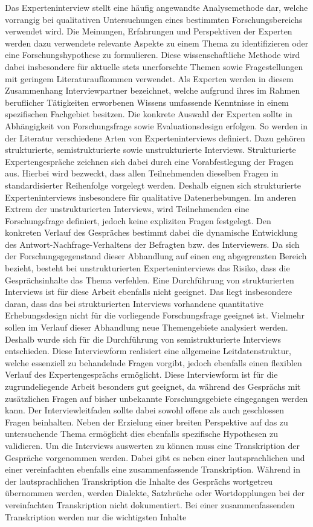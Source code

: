 Das Experteninterview stellt eine häufig angewandte Analysemethode dar, welche vorrangig bei qualitativen Untersuchungen eines bestimmten Forschungsbereichs verwendet wird. Die Meinungen, Erfahrungen und Perspektiven der Experten werden dazu verwendete relevante Aspekte zu einem Thema zu identifizieren oder eine Forschungshypothese zu formulieren. Diese wissenschaftliche Methode wird dabei insbesondere für aktuelle stets unerforschte Themen sowie Fragestellungen mit geringem Literaturaufkommen verwendet. Als Experten werden in diesem Zusammenhang Interviewpartner bezeichnet, welche aufgrund ihres im Rahmen beruflicher Tätigkeiten erworbenen Wissens umfassende Kenntnisse in einem spezifischen Fachgebiet besitzen. Die konkrete Auswahl der Experten sollte in Abhängigkeit von Forschungsfrage sowie Evaluationsdesign erfolgen. So werden in der Literatur verschiedene Arten von Experteninterviews definiert. Dazu gehören strukturierte, semistrukturierte sowie unstrukturierte Interviews. Strukturierte Expertengespräche zeichnen sich dabei durch eine Vorabfestlegung der Fragen aus. Hierbei wird bezweckt, dass allen Teilnehmenden dieselben Fragen in standardisierter Reihenfolge vorgelegt werden. Deshalb eignen sich strukturierte Experteninterviews insbesondere für qualitative Datenerhebungen. Im anderen Extrem der unstrukturierten Interviews, wird Teilnehmenden eine Forschungsfrage definiert, jedoch keine expliziten Fragen festgelegt. Den konkreten Verlauf des Gespräches bestimmt dabei die dynamische Entwicklung des Antwort-Nachfrage-Verhaltens der Befragten bzw. des Interviewers. Da sich der Forschungsgegenstand dieser Abhandlung auf einen eng abgegrenzten Bereich bezieht, besteht bei unstrukturierten Experteninterviews das Risiko, dass die Gesprächsinhalte das Thema verfehlen. Eine Durchführung von strukturierten Interviews ist für diese Arbeit ebenfalls nicht geeignet. Das liegt insbesondere daran, dass das bei strukturierten Interviews vorhandene quantitative Erhebungsdesign nicht für die vorliegende Forschungsfrage geeignet ist. Vielmehr sollen im Verlauf dieser Abhandlung neue Themengebiete analysiert werden. Deshalb wurde sich für die Durchführung von semistrukturierte Interviews entschieden. Diese Interviewform realisiert eine allgemeine Leitdatenstruktur, welche essenziell zu behandelnde Fragen vorgibt, jedoch ebenfalls einen flexiblen Verlauf des Expertengesprächs ermöglicht. Diese Interviewform ist für die zugrundeliegende Arbeit besonders gut geeignet, da während des Gesprächs mit zusätzlichen Fragen auf bisher unbekannte Forschungsgebiete eingegangen werden kann. Der Interviewleitfaden sollte dabei sowohl offene als auch geschlossen Fragen beinhalten. Neben der Erzielung einer breiten Perspektive auf das zu untersuchende Thema ermöglicht dies ebenfalls spezifische Hypothesen zu validieren. Um die Interviews auswerten zu können muss eine Transkription der Gespräche vorgenommen werden. Dabei gibt es neben einer lautsprachlichen und einer vereinfachten ebenfalls eine zusammenfassende Transkription. Während in der lautsprachlichen Transkription die Inhalte des Gesprächs wortgetreu übernommen werden, werden Dialekte, Satzbrüche oder Wortdopplungen bei der vereinfachten Transkription nicht dokumentiert. Bei einer zusammenfassenden Transkription werden nur die wichtigsten Inhalte 
